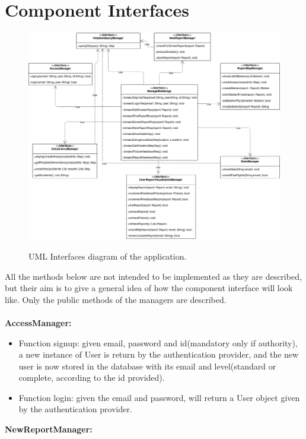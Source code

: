 \documentclass[../RASD.tex]{subfiles}
\begin{document}
    \section{Component Interfaces}\label{sec:component-interfaces}
    \begin{figure}[H]
        \centering
        \includegraphics[scale = 0.45]{assets/interfaces.png}\\[1.6 cm]
        \caption[\textit{UML Interfaces} Diagram]{UML Interfaces diagram of the application.}
    \end{figure}
    All the methods below are not intended to be implemented as they are described, but their aim is to give a general idea of how the component
    interface will look like.
    Only the public methods of the managers are described.
    \\
    \\
    \textbf{AccessManager:}
    \begin{itemize}
        \item Function signup: given email, password and id(mandatory only if authority), a new instance of User is return by the authentication provider,
        and the new user is now stored in the database with its email and level(standard or complete, according to the id provided).
        \item Function login: given the email and password, will return a User object given by the authentication provider.
    \end{itemize}
    \textbf{NewReportManager:}
\end{document}
